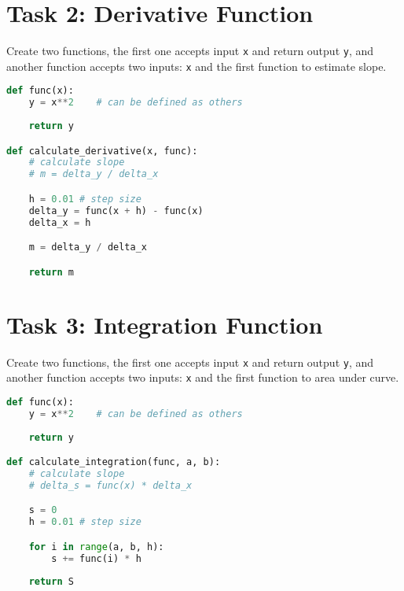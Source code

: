 \documentclass[11pt]{article}
\begin{document}
\noindent

\section*{Task 2: Derivative Function}
Create two functions, the first one accepts input \texttt{x} and return output \texttt{y}, and another function accepts two inputs: \texttt{x} and the first function to estimate slope.

\begin{lstlisting}[language=Python]
def func(x):
    y = x**2    # can be defined as others
    
    return y

def calculate_derivative(x, func):
    # calculate slope
    # m = delta_y / delta_x

    h = 0.01 # step size
    delta_y = func(x + h) - func(x)
    delta_x = h

    m = delta_y / delta_x

    return m
\end{lstlisting}

\begin{tcolorbox}[colback=black!10!white, colframe=black!75!white, title=\textbf{Answer}]
    \vspace{3cm}
\end{tcolorbox} 

\section*{Task 3: Integration Function}
Create two functions, the first one accepts input \texttt{x} and return output \texttt{y}, and another function accepts two inputs: \texttt{x} and the first function to area under curve.

\begin{lstlisting}[language=Python]
def func(x):
    y = x**2    # can be defined as others
    
    return y

def calculate_integration(func, a, b):
    # calculate slope
    # delta_s = func(x) * delta_x

    s = 0
    h = 0.01 # step size

    for i in range(a, b, h):
        s += func(i) * h
    
    return S
\end{lstlisting}

\begin{tcolorbox}[colback=black!10!white, colframe=black!75!white, title=\textbf{Answer}]
    \vspace{3cm}
\end{tcolorbox} 
\end{document}
